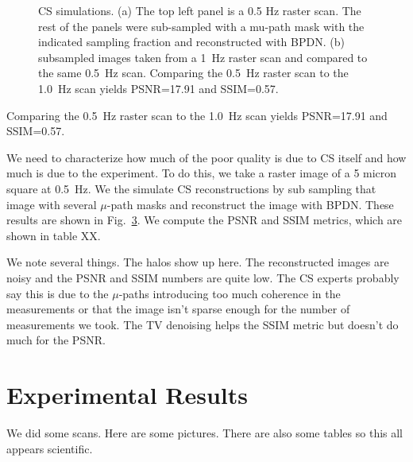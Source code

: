 \documentclass[11pt]{article}
\begin{document}
\begin{figure}[h!]
  \begin{subfigure}{1\textwidth}
      
  \caption{}
  \label{fig:cs_sim_0p5}
  \end{subfigure}
  \begin{subfigure}{1\textwidth}
    
    \caption{}
    \label{fig:cs_sim_raster_0p5_1p0}
  \end{subfigure}
  \caption{CS simulations. (a) The top left panel is a 0.5 Hz raster scan. The rest of the panels were sub-sampled with a mu-path mask with the indicated sampling fraction and reconstructed with BPDN. (b) subsampled images taken from a 1~Hz raster scan and compared to the same 0.5~Hz scan. Comparing the 0.5~Hz raster scan to the 1.0~Hz scan yields PSNR=17.91 and SSIM=0.57.}
  \label{fig:cs_sim_against_raster}
\end{figure}

Comparing the 0.5~Hz raster scan to the 1.0~Hz scan yields PSNR=17.91 and SSIM=0.57.

We need to characterize how much of the poor quality is due to CS itself and how much is due to the experiment. To do this, we take a raster image of a 5 micron square at 0.5~Hz. We the simulate CS reconstructions by sub sampling that image with several $\mu$-path masks and reconstruct the image with BPDN. These results are shown in Fig.~\ref{fig:cs_sim_against_raster}. We compute the PSNR and SSIM metrics, which are shown in table XX.

We note several things. The halos show up here. The reconstructed images are noisy and the PSNR and SSIM numbers are quite low. The CS experts probably say this is due to the $\mu$-paths introducing too much coherence in the measurements or that the image isn't sparse enough for the number of measurements we took. The TV denoising helps the SSIM metric but doesn't do much for the PSNR.

\section{Experimental Results}\label{sec:results:final}
We did some scans. Here are some pictures. There are also some tables so this all appears scientific.



\end{document}
